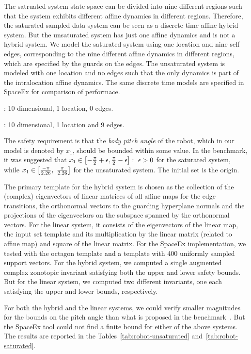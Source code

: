 The satruated system state space can be divided into nine different
regions such that the system exhibits different affine dynamics in
different regions.  Therefore, the saturated sampled data system can
be seen as a discrete time affine hybrid system.  But the unsaturated
system has just one affine dynamics and is not a hybrid system.  We
model the saturated system using one location and nine self edges,
corresponding to the nine different affine dynamics in different
regions, which are specified by the guards on the edges.  The
unsaturated system is modeled with one location and no edges such that
the only dynamics is part of the intralocation affine dynamics.  The
same discrete time models are specified in SpaceEx for comparison of
performace.

: 10 dimensional, 1 location, 0 edges.

: 10 dimensional, 1 location and 9 edges.

The safety requirement is that the \emph{body pitch angle} of the
robot, which in our model is denoted by $x_1$, should be bounded
within some value. In the benchmark, it was suggested that
$x_1\in\left[-\frac{\pi}{2}+\epsilon,\frac{\pi}{2}-\epsilon\right]:~\epsilon>0$
for the saturated system, while
$x_1\in\left[\frac{-\pi}{2.26},~\frac{\pi}{2.26}\right]$ for the
unsaturated system. The initial set is the origin.

  The primary template for the hybrid system is
chosen as the collection of the (complex) eigenvectors of linear
matrices of all affine maps for the edge transitions, the orthonormal
vectors to the guarding hyperplane normals and the projections of the
eigenvectors on the subspace spanned by the orthonormal vectors.  For
the linear system, it consists of the eigenvectors of the linear map,
the input set template and its multiplication by the linear matrix
(related to affine map) and square of the linear matrix.  For the
SpaceEx implementation, we tested with the octagon template and a
template with 400 uniformly sampled support vectors.  For the hybrid
system, we computed a single augmented complex zonotopic invariant
satisfying both the upper and lower safety bounds.  But for the linear
system, we computed two different invariants, one each satisfying the
upper and lower bounds, respectively.

  For both the hybrid and the linear systems, we could
verify smaller magnitudes for the bounds on the pitch angle than what
is proposed in the benchmark~\cite{heinz2014benchmark}.  But the
SpaceEx tool could not find a finite bound for either of the above
systems.  The results are reported in the
Tables~\ref{tab:robot-unsaturated} and~\ref{tab:robot-saturated}.

